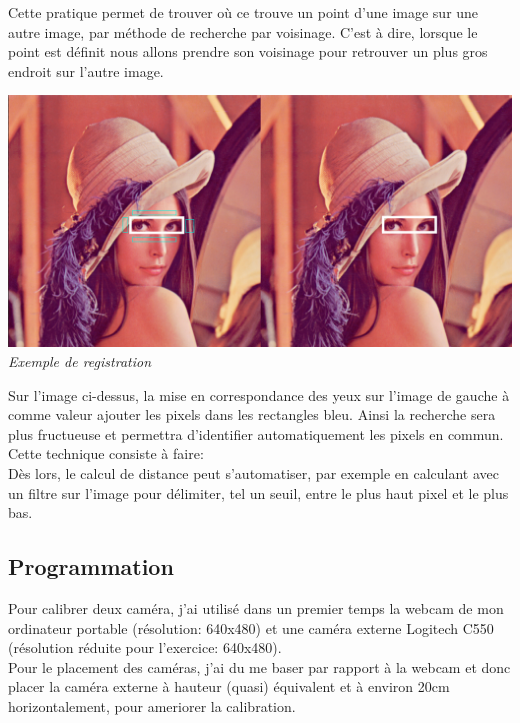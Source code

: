 \documentclass[12pt, french]{report}
\begin{document}
Cette pratique permet de trouver où ce trouve un point d'une image sur une autre image, par méthode de recherche par voisinage. C'est à dire, lorsque le point est définit nous allons prendre son voisinage pour retrouver un plus gros endroit sur l'autre image.

\begin{center}
    \includegraphics[width=\textwidth]{Images/Vision/Registration.PNG}\\
    \textit{Exemple de registration}\\
\end{center}

Sur l'image ci-dessus, la mise en correspondance des yeux sur l'image de gauche à comme valeur ajouter les pixels dans les rectangles bleu. Ainsi la recherche sera plus fructueuse et permettra d'identifier automatiquement les pixels en commun.\\

Cette technique consiste à faire: \\

Dès lors, le calcul de distance peut s'automatiser, par exemple en calculant avec un filtre sur l'image pour délimiter, tel un seuil, entre le plus haut pixel et le plus bas.


\subsection{Programmation}

Pour calibrer deux caméra, j'ai utilisé dans un premier temps la webcam de mon ordinateur portable (résolution: 640x480) et une caméra externe Logitech C550 (résolution réduite pour l'exercice: 640x480).\\

Pour le placement des caméras, j'ai du me baser par rapport à la webcam et donc placer la caméra externe à hauteur (quasi) équivalent et à environ 20cm horizontalement, pour ameriorer la calibration.\\
\end{document}
